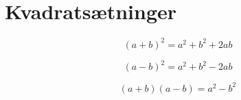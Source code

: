 \section{Kvadratsætninger}
\[(a+b)^2 =a^2 +b^2 +2ab\]

\[(a-b)^2 =a^2 +b^2 -2ab\]

\[(a+b)(a-b)=a^2 -b^2\]



